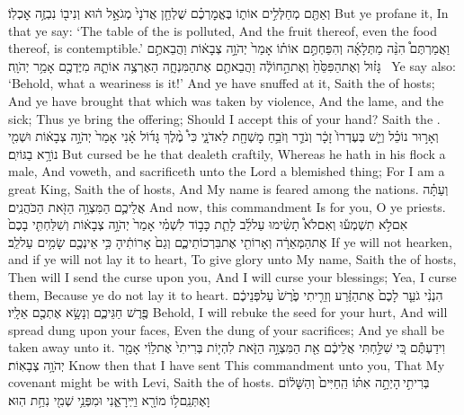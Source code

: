 {וְאַתֶּ֖ם מְחַלְּלִ֣ים אוֹת֑וֹ בֶּאֱמׇרְכֶ֗ם שֻׁלְחַ֤ן אֲדֹנָי֙ מְגֹאָ֣ל ה֔וּא וְנִיב֖וֹ נִבְזֶ֥ה אׇכְלֽוֹ׃}
{But ye profane it, In that ye say: ‘The table of the \lord\space is polluted, And the fruit thereof, even the food thereof, is contemptible.’}
{וַאֲמַרְתֶּם֩ הִנֵּ֨ה מַתְּלָאָ֜ה וְהִפַּחְתֶּ֣ם אוֹת֗וֹ אָמַר֙ יְהֹוָ֣ה צְבָא֔וֹת וַהֲבֵאתֶ֣ם גָּז֗וּל וְאֶת\maqqaf הַפִּסֵּ֙חַ֙ וְאֶת\maqqaf הַ֣חוֹלֶ֔ה וַהֲבֵאתֶ֖ם אֶת\maqqaf הַמִּנְחָ֑ה הַאֶרְצֶ֥ה אוֹתָ֛הּ מִיֶּדְכֶ֖ם אָמַ֥ר יְהֹוָֽה׃ \setuma }
{Ye say also: ‘Behold, what a weariness is it!’ And ye have snuffed at it, Saith the \lord\space of hosts; And ye have brought that which was taken by violence, And the lame, and the sick; Thus ye bring the offering; Should I accept this of your hand? Saith the \lord.}
{וְאָר֣וּר נוֹכֵ֗ל וְיֵ֤שׁ בְּעֶדְרוֹ֙ זָכָ֔ר וְנֹדֵ֛ר וְזֹבֵ֥חַ מׇשְׁחָ֖ת לַאדֹנָ֑י כִּי֩ מֶ֨לֶךְ גָּד֜וֹל אָ֗נִי אָמַר֙ יְהֹוָ֣ה צְבָא֔וֹת וּשְׁמִ֖י נוֹרָ֥א בַגּוֹיִֽם׃}
{But cursed be he that dealeth craftily, Whereas he hath in his flock a male, And voweth, and sacrificeth unto the Lord a blemished thing; For I am a great King, Saith the \lord\space of hosts, And My name is feared among the nations.}
\newperek
{}
{וְעַתָּ֗ה אֲלֵיכֶ֛ם הַמִּצְוָ֥ה הַזֹּ֖את הַכֹּהֲנִֽים׃}
{And now, this commandment Is for you, O ye priests.}
{אִם\maqqaf לֹ֣א תִשְׁמְע֡וּ וְאִם\maqqaf לֹא֩ תָשִׂ֨ימוּ עַל\maqqaf לֵ֜ב לָתֵ֧ת כָּב֣וֹד לִשְׁמִ֗י אָמַר֙ יְהֹוָ֣ה צְבָא֔וֹת וְשִׁלַּחְתִּ֤י בָכֶם֙ אֶת\maqqaf הַמְּאֵרָ֔ה וְאָרוֹתִ֖י אֶת\maqqaf בִּרְכוֹתֵיכֶ֑ם וְגַם֙ אָרוֹתִ֔יהָ כִּ֥י אֵינְכֶ֖ם שָׂמִ֥ים עַל\maqqaf לֵֽב׃}
{If ye will not hearken, and if ye will not lay it to heart, To give glory unto My name, Saith the \lord\space of hosts, Then will I send the curse upon you, And I will curse your blessings; Yea, I curse them, Because ye do not lay it to heart.}
{הִנְנִ֨י גֹעֵ֤ר לָכֶם֙ אֶת\maqqaf הַזֶּ֔רַע וְזֵרִ֤יתִי פֶ֙רֶשׁ֙ עַל\maqqaf פְּנֵיכֶ֔ם פֶּ֖רֶשׁ חַגֵּיכֶ֑ם וְנָשָׂ֥א אֶתְכֶ֖ם אֵלָֽיו׃}
{Behold, I will rebuke the seed for your hurt, And will spread dung upon your faces, Even the dung of your sacrifices; And ye shall be taken away unto it.}
{וִידַעְתֶּ֕ם כִּ֚י שִׁלַּ֣חְתִּי אֲלֵיכֶ֔ם אֵ֖ת הַמִּצְוָ֣ה הַזֹּ֑את לִהְי֤וֹת בְּרִיתִי֙ אֶת\maqqaf לֵוִ֔י אָמַ֖ר יְהֹוָ֥ה צְבָאֽוֹת׃}
{Know then that I have sent This commandment unto you, That My covenant might be with Levi, Saith the \lord\space of hosts.}
{בְּרִיתִ֣י \legarmeh  הָיְתָ֣ה אִתּ֗וֹ הַֽחַיִּים֙ וְהַשָּׁל֔וֹם וָאֶתְּנֵֽם\maqqaf ל֥וֹ מוֹרָ֖א וַיִּֽירָאֵ֑נִי וּמִפְּנֵ֥י שְׁמִ֖י נִחַ֥ת הֽוּא׃}
